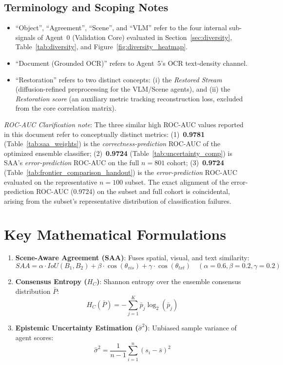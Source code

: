 \documentclass[11pt,a4paper]{article}
\newcommand{\term}[1]{\textbf{#1}}
\begin{document}
\subsection*{Terminology and Scoping Notes}
\begin{itemize}[leftmargin=*, noitemsep]
    \item ``Object'', ``Agreement'', ``Scene'', and ``VLM'' refer to the four internal sub-signals of Agent~0 (Validation Core) evaluated in Section~\ref{sec:diversity}, Table~\ref{tab:diversity}, and Figure~\ref{fig:diversity_heatmap}.
    \item ``Document (Grounded OCR)'' refers to Agent~5's OCR text-density channel.
    \item ``Restoration'' refers to two distinct concepts: (i) the \textit{Restored Stream} (diffusion-refined preprocessing for the VLM/Scene agents), and (ii) the \textit{Restoration score} (an auxiliary metric tracking reconstruction loss, excluded from the core correlation matrix).
\end{itemize}

\textit{ROC-AUC Clarification note}: The three similar high ROC-AUC values reported in this document refer to conceptually distinct metrics: (1)~\textbf{0.9781} (Table~\ref{tab:saa_weights}) is the \emph{correctness-prediction} ROC-AUC of the optimized ensemble classifier; (2)~\textbf{0.9724} (Table~\ref{tab:uncertainty_comp}) is SAA's \emph{error-prediction} ROC-AUC on the full $n=801$ cohort; (3)~\textbf{0.9724} (Table~\ref{tab:frontier_comparison_handout}) is the \emph{error-prediction} ROC-AUC evaluated on the representative $n=100$ subset. The exact alignment of the error-prediction ROC-AUC (0.9724) on the subset and full cohort is coincidental, arising from the subset's representative distribution of classification failures.

\section{Key Mathematical Formulations}\label{sec:math_formulations}
\begin{enumerate}[leftmargin=*, noitemsep]
    \item \term{Scene-Aware Agreement (SAA)}: Fuses spatial, visual, and text similarity:
    \[ SAA = \alpha \cdot IoU(B_1, B_2) + \beta \cdot \cos(\theta_{vis}) + \gamma \cdot \cos(\theta_{txt}) \quad (\alpha=0.6, \beta=0.2, \gamma=0.2) \]
    \item \term{Consensus Entropy ($H_C$)}: Shannon entropy over the ensemble consensus distribution $\bar{P}$:
    \[ H_C(\bar{P}) = -\sum_{j=1}^K \bar{p}_j \log_2(\bar{p}_j) \]
    \item \term{Epistemic Uncertainty Estimation ($\hat{\sigma}^2$)}: Unbiased sample variance of agent scores:
    \[ \hat{\sigma}^2 = \frac{1}{n-1}\sum_{i=1}^{n}(s_i - \bar{s})^2 \]
\end{enumerate}
\end{document}
